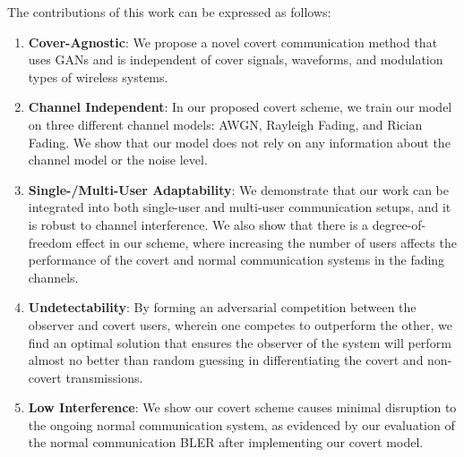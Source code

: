 The contributions of this work can be expressed as follows:
\begin{enumerate}
	\item \textbf{Cover-Agnostic}: We propose a novel covert communication method that uses GANs and is independent of cover signals, waveforms, and modulation types of wireless systems.
	\item \textbf{Channel Independent}: In our proposed covert scheme, we train our model on three different channel models: AWGN, Rayleigh Fading, and Rician Fading. We show that our model does not rely on any information about the channel model or the noise level.
	\item \textbf{Single-/Multi-User Adaptability}: We demonstrate that our work can be integrated into both single-user and multi-user communication setups, and it is robust to channel interference. We also show that there is a degree-of-freedom effect in our scheme, where increasing the number of users affects the performance of the covert and normal communication systems in the fading channels.
	\item \textbf{Undetectability}: By forming an adversarial competition between the observer and covert users, wherein one competes to outperform the other, we find an optimal solution that ensures the observer of the system will perform almost no better than random guessing in differentiating the covert and non-covert transmissions.
	\item \textbf{Low Interference}: We show our covert scheme causes minimal disruption to the ongoing normal communication system, as evidenced by our evaluation of the normal communication BLER after implementing our covert model.
\end{enumerate}
